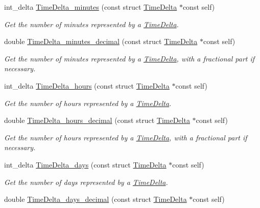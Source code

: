 \begin{DoxyCompactItemize}
int\-\_\-delta \hyperlink{time-delta_8h_a561b203a50b7386cd1076e05f98eb488}{\-Time\-Delta\-\_\-minutes} (const struct \hyperlink{structTimeDelta}{\-Time\-Delta} $\ast$const self)
\begin{DoxyCompactList}\small\item\em \-Get the number of minutes represented by a \hyperlink{structTimeDelta}{\-Time\-Delta}. \end{DoxyCompactList}\item 
double \hyperlink{time-delta_8h_ae77d3ff682af80dff0e2d601143c4bd7}{\-Time\-Delta\-\_\-minutes\-\_\-decimal} (const struct \hyperlink{structTimeDelta}{\-Time\-Delta} $\ast$const self)
\begin{DoxyCompactList}\small\item\em \-Get the number of minutes represented by a \hyperlink{structTimeDelta}{\-Time\-Delta}, with a fractional part if necessary. \end{DoxyCompactList}\item 
int\-\_\-delta \hyperlink{time-delta_8h_aaf78ae5ac19ba90ef26ff6cfc89ea734}{\-Time\-Delta\-\_\-hours} (const struct \hyperlink{structTimeDelta}{\-Time\-Delta} $\ast$const self)
\begin{DoxyCompactList}\small\item\em \-Get the number of hours represented by a \hyperlink{structTimeDelta}{\-Time\-Delta}. \end{DoxyCompactList}\item 
double \hyperlink{time-delta_8h_ab3eac32bcfa848e984b2d3d2fb48f2f3}{\-Time\-Delta\-\_\-hours\-\_\-decimal} (const struct \hyperlink{structTimeDelta}{\-Time\-Delta} $\ast$const self)
\begin{DoxyCompactList}\small\item\em \-Get the number of hours represented by a \hyperlink{structTimeDelta}{\-Time\-Delta}, with a fractional part if necessary. \end{DoxyCompactList}\item 
int\-\_\-delta \hyperlink{time-delta_8h_ae7e2ca9c2f8ce05faf4ba2a207d0e8dd}{\-Time\-Delta\-\_\-days} (const struct \hyperlink{structTimeDelta}{\-Time\-Delta} $\ast$const self)
\begin{DoxyCompactList}\small\item\em \-Get the number of days represented by a \hyperlink{structTimeDelta}{\-Time\-Delta}. \end{DoxyCompactList}\item 
double \hyperlink{time-delta_8h_a5b79dc42f8fca1ea501e016a24440464}{\-Time\-Delta\-\_\-days\-\_\-decimal} (const struct \hyperlink{structTimeDelta}{\-Time\-Delta} $\ast$const self)

\end{DoxyCompactItemize}

